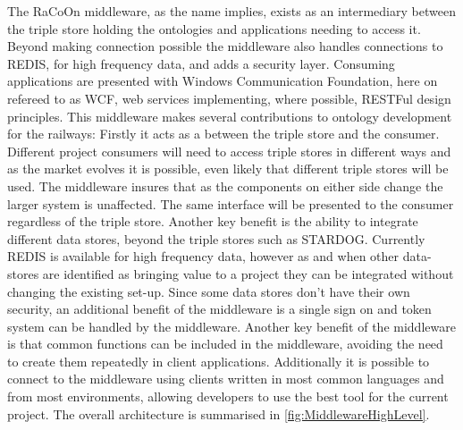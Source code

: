 The RaCoOn middleware, as the name implies, exists as an intermediary between the triple store holding the ontologies and applications needing to access it. Beyond making connection possible the middleware also handles connections to REDIS, for high frequency data, and adds a security layer. Consuming applications are presented with Windows Communication Foundation, here on refereed to as WCF, web services implementing, where possible, RESTFul design principles. This middleware makes several contributions to ontology development for the railways: Firstly it acts as a  between the triple store and the consumer. Different project consumers will need to access triple stores in different ways and as the market evolves it is possible, even likely that different triple stores will be used. The middleware insures that as the components on either side change the larger system is unaffected. The same interface will be presented to the consumer regardless of the triple store. Another key benefit is the ability to integrate different data stores, beyond the triple stores such as STARDOG. Currently REDIS is available for high frequency data, however as and when other data-stores are identified as bringing value to a project they can be integrated without changing the existing set-up. Since some data stores don't have their own security, an additional benefit of the middleware is a single sign on and token system can be handled by the middleware. Another key benefit of the middleware is that common functions can be included in the middleware, avoiding the need to create them repeatedly in client applications. Additionally it is possible to connect to the middleware using clients written in most common languages and from most environments, allowing developers to use the best tool for the current project. The overall architecture is summarised in \autoref{fig:MiddlewareHighLevel}.

